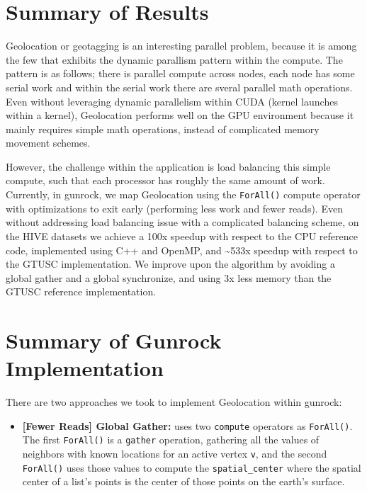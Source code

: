 \documentclass[10pt,oneside]{memoir}
\providecommand{\tightlist}{%
  \setlength{\itemsep}{0pt}\setlength{\parskip}{0pt}}
\begin{document}
\hypertarget{summary-of-results-1}{%
\section{Summary of Results}\label{summary-of-results-1}}

Geolocation or geotagging is an interesting parallel problem, because it
is among the few that exhibits the dynamic parallism pattern within the
compute. The pattern is as follows; there is parallel compute across
nodes, each node has some serial work and within the serial work there
are sveral parallel math operations. Even without leveraging dynamic
parallelism within CUDA (kernel launches within a kernel), Geolocation
performs well on the GPU environment because it mainly requires simple
math operations, instead of complicated memory movement schemes.

However, the challenge within the application is load balancing this
simple compute, such that each processor has roughly the same amount of
work. Currently, in gunrock, we map Geolocation using the
\texttt{ForAll()} compute operator with optimizations to exit early
(performing less work and fewer reads). Even without addressing load
balancing issue with a complicated balancing scheme, on the HIVE
datasets we achieve a 100x speedup with respect to the CPU reference
code, implemented using C++ and OpenMP, and \textasciitilde{}533x
speedup with respect to the GTUSC implementation. We improve upon the
algorithm by avoiding a global gather and a global synchronize, and
using 3x less memory than the GTUSC reference implementation.

\hypertarget{summary-of-gunrock-implementation}{%
\section{Summary of Gunrock
Implementation}\label{summary-of-gunrock-implementation}}

There are two approaches we took to implement Geolocation within
gunrock:

\begin{itemize}
\tightlist
\item
  \textbf{{[}Fewer Reads{]} Global Gather:} uses two \texttt{compute}
  operators as \texttt{ForAll()}. The first \texttt{ForAll()} is a
  \texttt{gather} operation, gathering all the values of neighbors with
  known locations for an active vertex \texttt{v}, and the second
  \texttt{ForAll()} uses those values to compute the
  \texttt{spatial\_center} where the spatial center of a list's points
  is the center of those points on the earth's surface.
\end{itemize}
\end{document}
